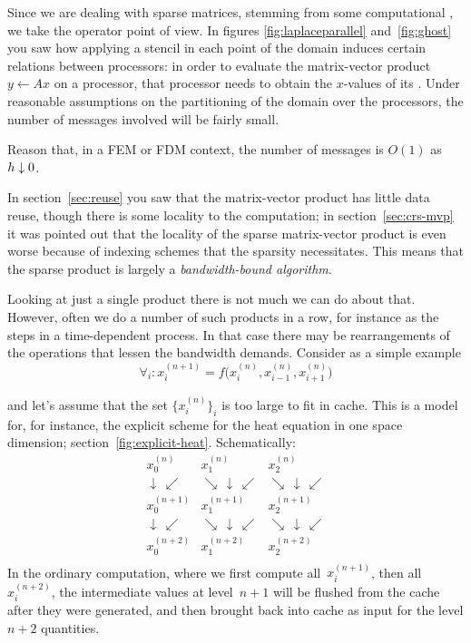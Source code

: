 Since we are dealing with sparse matrices, stemming from some
computational
,
we take the operator point of view. In figures \ref{fig:laplaceparallel} 
and~\ref{fig:ghost} you saw how applying a stencil in each point of the domain 
induces certain relations between processors: in order to evaluate the matrix-vector
product $y\leftarrow Ax$ on a processor, that processor needs to obtain the $x$-values
of its . Under reasonable assumptions on the partitioning
of the domain over the processors, the number of messages involved will be fairly
small.

\begin{exercise}
Reason that, in a \ac{FEM} or \ac{FDM} context,
the number of messages is $O(1)$ as~$h\downarrow\nobreak 0$.
\end{exercise}

In section~\ref{sec:reuse} you saw that the matrix-vector product has
little data reuse, though there is some locality to the computation;
in section~\ref{sec:crs-mvp} it was pointed out that the locality of the 
sparse matrix-vector product is even worse because of
indexing schemes that the sparsity necessitates. This means that the sparse
product is largely a \emph{bandwidth-bound algorithm}. 

Looking at just a
single product there is not much we can do about that. 
However, 
often we do a number of such products in a row, for instance as the steps
in a time-dependent process. In that case there may be rearrangements
of the operations that lessen the bandwidth demands. Consider as a simple example
\begin{equation}
\forall_i\colon x^{(n+1)}_i = f\bigl( x^{(n)}_i, x^{(n)}_{i-1}, x^{(n)}_{i+1} \bigr)
\label{eq:3p-average}
\end{equation}

and let's assume that the set $\{x^{(n)}_i\}_i$ is too large to fit 
in cache.
This is a model for, for instance, the explicit scheme for the heat
equation in one space dimension; section~\ref{fig:explicit-heat}.
Schematically:
\[
\begin{array}{ccccc}
  x^{(n)}_0&x^{(n)}_1&x^{(n)}_2\\
  \downarrow\,\swarrow&\searrow\,\downarrow\,\swarrow&\searrow\,\downarrow\,\swarrow\\
  x^{(n+1)}_0&x^{(n+1)}_1&x^{(n+1)}_2\\
  \downarrow\,\swarrow&\searrow\,\downarrow\,\swarrow&\searrow\,\downarrow\,\swarrow\\
  x^{(n+2)}_0&x^{(n+2)}_1&x^{(n+2)}_2\\
\end{array}
\]
In the ordinary computation, where we first compute all~$x^{(n+1)}_i$, 
then all~$x^{(n+2)}_i$, the intermediate values at level~$n+1$
will be flushed from the cache
after they were generated, and then brought back into cache as input for the
level $n+2$ quantities.


